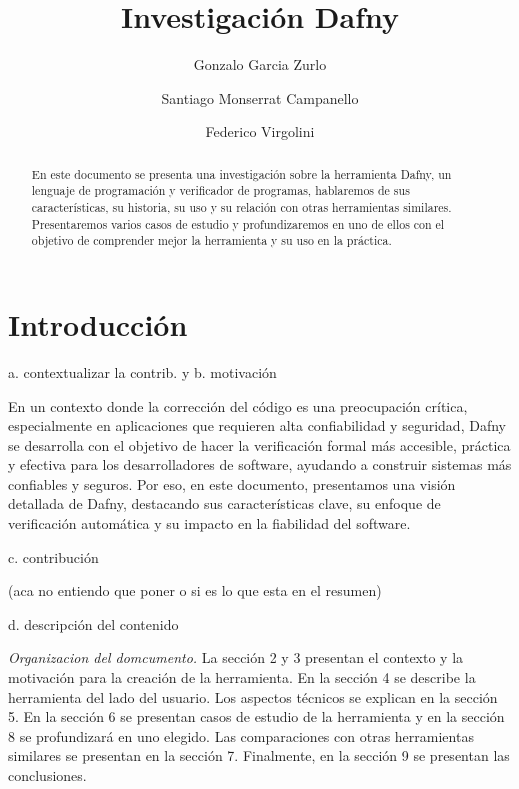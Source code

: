 \documentclass[runningheads]{llncs}
\begin{document}
%
\title{Investigación Dafny}
%
\author{Gonzalo Garcia Zurlo \and
Santiago Monserrat Campanello \and
Federico Virgolini}
%
%
%
\maketitle
\begin{abstract}
En este documento se presenta una investigación sobre la herramienta Dafny, un lenguaje de programación y verificador de programas,
hablaremos de sus características, su historia, su uso y su relación con otras herramientas similares. 
Presentaremos varios casos de estudio y profundizaremos en uno de ellos con el objetivo de comprender mejor la herramienta y su uso en la práctica.
\end{abstract}

\section{Introducción}

a. contextualizar la contrib. y b. motivación

En un contexto donde la corrección del código es una preocupación crítica, especialmente en aplicaciones que requieren alta confiabilidad y seguridad,
Dafny se desarrolla con el objetivo de hacer la verificación formal más accesible, práctica y efectiva para los desarrolladores de software, 
ayudando a construir sistemas más confiables y seguros. Por eso, en este documento, presentamos una visión detallada de Dafny, 
destacando sus características clave, su enfoque de verificación automática y su impacto en la fiabilidad del software.

c. contribución

(aca no entiendo que poner o si es lo que esta en el resumen)

d. descripción del contenido

\emph{Organizacion del domcumento.} La sección 2 y 3 presentan el contexto y la motivación para la creación de la herramienta.
En la sección 4 se describe la herramienta del lado del usuario. Los aspectos técnicos se explican en la sección 5.
En la sección 6 se presentan casos de estudio de la herramienta y en la sección 8 se profundizará en uno elegido. 
Las comparaciones con otras herramientas similares se presentan en la sección 7. Finalmente, en la sección 9 se presentan las conclusiones.
\end{document}
